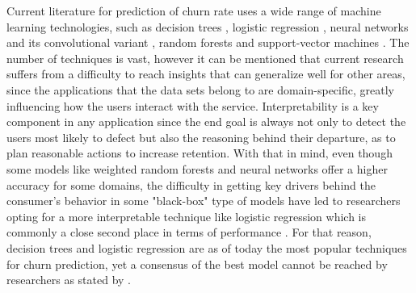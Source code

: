 \documentclass{kththesis}
\begin{document}
Current literature for prediction of churn rate uses a wide range of machine learning technologies, such as decision trees \citep{Pudipeddi2014}\citep{Hassouna2015} \citep{Ballings2012} \citep{Khan2015}, logistic regression \citep{GurAli2014}, neural networks \citep{Runge2014} and its convolutional variant \citep{Wangperawong2016}, random forests \citep{Dror2012} and support-vector machines \citep{coussement2008churn}. The number of techniques is vast, however it can be mentioned that current research suffers from a difficulty to reach insights that can generalize well for other areas, since the applications that the data sets belong to are domain-specific, greatly influencing how the users interact with the service. Interpretability is a key component in any application since the end goal is always not only to detect the users most likely to defect but also the reasoning behind their departure, as to plan reasonable actions to increase retention. With that in mind, even though some models like weighted random forests \citep{Burez2009} and neural networks \citep{Runge2014} offer a higher accuracy for some domains, the difficulty in getting key drivers behind the consumer's behavior in some "black-box" type of models have led to researchers opting for a more interpretable technique like logistic regression which is commonly a close second place in terms of performance \citep{Runge2014} \citep{Dror2012}. For that reason, decision trees and logistic regression are as of today the most popular techniques for churn prediction, yet a consensus of the best model cannot be reached by researchers as stated by \citep{mahajan2015review}. 
\end{document}
